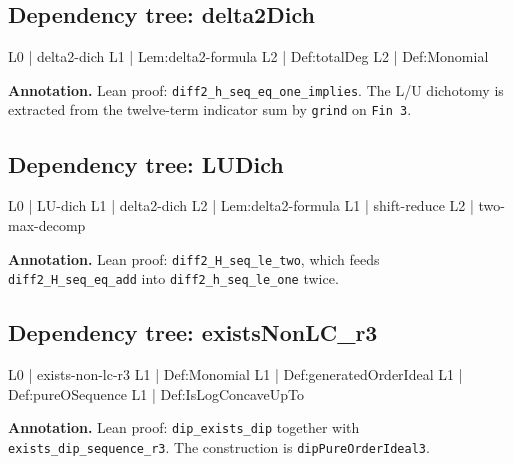 \documentclass[11pt,reqno]{amsart}
\begin{document}
\medskip

\subsection*{Dependency tree: \textsf{delta2Dich}}

\noindent%
\begin{minipage}[t]{0.48\linewidth}
	\vspace{0pt}
	\begin{verbatimbox}
		L0 | delta2-dich
		L1 |   Lem:delta2-formula
		L2 |     Def:totalDeg
		L2 |     Def:Monomial
	\end{verbatimbox}
\end{minipage}\hfill 
\begin{minipage}[t]{0.48\linewidth}
	\vspace{0pt}
	\textbf{Annotation.} Lean proof: \texttt{diff2\_h\_seq\_eq\_one\_implies}. The L/U dichotomy is extracted from the twelve-term indicator sum by \texttt{grind} on \texttt{Fin 3}.
\end{minipage}

\medskip

\subsection*{Dependency tree: \textsf{LUDich}}

\noindent%
\begin{minipage}[t]{0.48\linewidth}
	\vspace{0pt}
	\begin{verbatimbox}
		L0 | LU-dich
		L1 |   delta2-dich
		L2 |     Lem:delta2-formula
		L1 |   shift-reduce
		L2 |     two-max-decomp
	\end{verbatimbox}
\end{minipage}\hfill 
\begin{minipage}[t]{0.48\linewidth}
	\vspace{0pt}
	\textbf{Annotation.} Lean proof: \texttt{diff2\_H\_seq\_le\_two}, which feeds \texttt{diff2\_H\_seq\_eq\_add} into \texttt{diff2\_h\_seq\_le\_one} twice.
\end{minipage}

\medskip

\subsection*{Dependency tree: \textsf{existsNonLC\_r3}}

\noindent%
\begin{minipage}[t]{0.48\linewidth}
	\vspace{0pt}
	\begin{verbatimbox}
		L0 | exists-non-lc-r3
		L1 |   Def:Monomial
		L1 |   Def:generatedOrderIdeal
		L1 |   Def:pureOSequence
		L1 |   Def:IsLogConcaveUpTo
	\end{verbatimbox}
\end{minipage}\hfill 
\begin{minipage}[t]{0.48\linewidth}
	\vspace{0pt}
	\textbf{Annotation.} Lean proof: \texttt{dip\_exists\_dip} together with \texttt{exists\_dip\_sequence\_r3}. The construction is \texttt{dipPureOrderIdeal3}.
\end{minipage}
\end{document}

